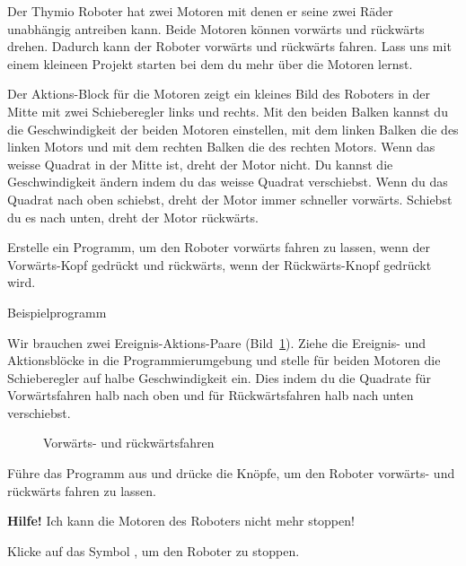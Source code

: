 \label{c.moving}


Der Thymio Roboter hat zwei Motoren mit denen er seine zwei Räder unabhängig antreiben
kann. Beide Motoren können vorwärts und rückwärts drehen. Dadurch kann der
Roboter vorwärts und rückwärts fahren. Lass uns mit einem kleineen Projekt starten bei dem du mehr über die Motoren lernst.

Der Aktions-Block für die Motoren  zeigt ein kleines Bild
des Roboters in der Mitte mit zwei Schieberegler links und rechts. Mit den beiden Balken kannst du die
Geschwindigkeit der beiden Motoren einstellen, mit dem linken Balken die des
linken Motors und mit dem rechten Balken die des rechten Motors. Wenn das
weisse Quadrat in der Mitte ist, dreht der Motor nicht. 
Du kannst die Geschwindigkeit ändern indem du das weisse Quadrat verschiebst.
Wenn du das Quadrat
nach oben schiebst, dreht der Motor immer schneller vorwärts. Schiebst du es
nach unten, dreht der Motor rückwärts.

Erstelle ein Programm, um den Roboter vorwärts fahren zu lassen, wenn der
Vorwärts-Kopf gedrückt und rückwärts, wenn der Rückwärts-Knopf gedrückt
wird.

{\raggedleft \hfill Beispielprogramm }

Wir brauchen zwei Ereignis-Aktions-Paare (Bild~\ref{fig.nostop}). 
Ziehe die Ereignis- und Aktionsblöcke in die Programmierumgebung und stelle für beiden Motoren die Schieberegler auf halbe Geschwindigkeit ein. Dies indem du die Quadrate für Vorwärtsfahren halb nach oben und für Rückwärtsfahren halb nach unten verschiebst.

\begin{figure}
\begin{center}
\caption{Vorwärts- und rückwärtsfahren}\label{fig.nostop}
\end{center}
\end{figure}

Führe das Programm aus und drücke die Knöpfe, um den Roboter vorwärts- und rückwärts fahren zu lassen. 

\newpage


\textbf{Hilfe!} Ich kann die Motoren des Roboters nicht mehr stoppen!

Klicke auf das Symbol , um den Roboter zu stoppen.

